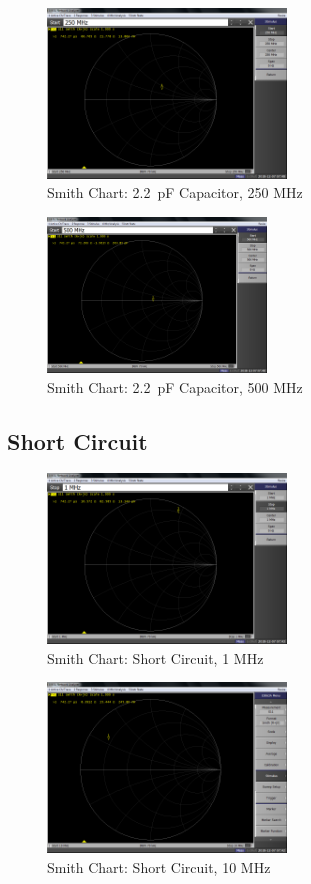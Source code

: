 \documentclass[conference]{IEEEtran}
\begin{document}
\begin{figure}[H]
  \centering
  \includegraphics[width=2.5in]{./img/smith_2_pF_250_MHz.png}
  \caption{Smith Chart: \SI{2.2}{\pico\farad} Capacitor, 250 MHz}
  \label{fig:smith_2_pF_250_MHz}
\end{figure}

\begin{figure}[H]
  \centering
  \includegraphics[width=2.29in]{./img/smith_2_pF_500_MHz.png}
  \caption{Smith Chart: \SI{2.2}{\pico\farad} Capacitor, 500 MHz}
  \label{fig:smith_2_pF_500_MHz}
\end{figure}

\subsection{Short Circuit}

\begin{figure}[H]
  \centering
  \includegraphics[width=2.5in]{./img/smith_short_1_MHz.png}
  \caption{Smith Chart: Short Circuit, 1 MHz}
  \label{fig:smith_short_1_MHz}
\end{figure}

\begin{figure}[H]
  \centering
  \includegraphics[width=2.5in]{./img/smith_short_10_MHz.png}
  \caption{Smith Chart: Short Circuit, 10 MHz}
  \label{fig:smith_short_10_MHz}
\end{figure}
\end{document}
